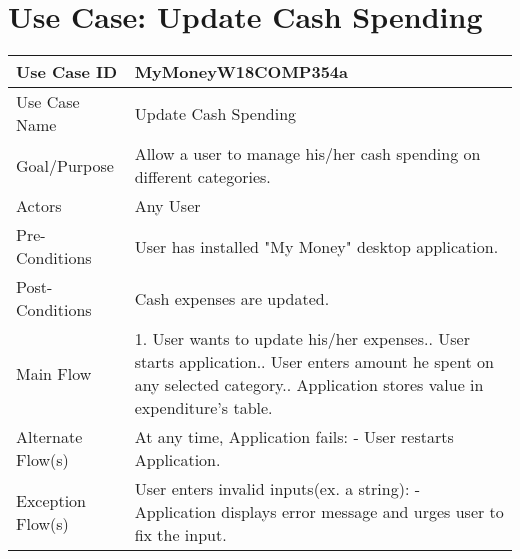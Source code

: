 \documentclass{article}
\begin{document}
\section{Use Case: Update Cash Spending}

\medskip
\begin{center}
\begin{tabular}{| l | p{6cm} |}
\hline

Use Case ID  & MyMoneyW18COMP354a\\
\hline
Use Case Name  & Update Cash Spending\\
\hline
Goal/Purpose  & Allow a user to manage his/her cash spending on different categories.\\
\hline
Actors  & Any User\\
\hline
Pre-Conditions &  User has installed "My Money" desktop application. \\
\hline
Post-Conditions & Cash expenses are updated.  \\
\hline
Main Flow & 
1. User wants to update his/her expenses.\newline 2. User starts application.\newline
3. User enters amount he spent on any selected category.\newline
4. Application stores value in expenditure's table. 
\\
\hline
Alternate Flow(s) & 
At any time, Application fails: \newline
   - User restarts Application.
\\
\hline
Exception Flow(s) & 
User enters invalid inputs(ex. a string):\newline
- Application displays error message and urges user to fix the input. \\
\hline

\end{tabular}
\end{center}
\end{document}
